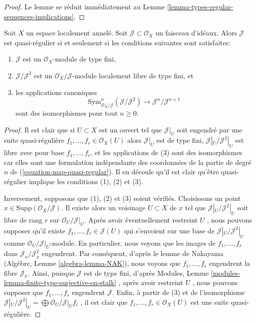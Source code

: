\begin{proof}
Le lemme se réduit immédiatement au Lemme  \ref{lemma-types-regular-sequences-implications}.
\end{proof}

\begin{lemma}
\label{lemma-quasi-regular-ideal}
Soit  $X$  un espace localement annelé. Soit  $\mathcal{J} \subset \mathcal{O}_X$  un faisceau
d'idéaux. Alors  $\mathcal{J}$  est quasi-régulier si et seulement si les conditions
suivantes sont satisfaites:
\begin{enumerate}
\item $\mathcal{J}$  est un  $\mathcal{O}_X$-module de type fini,
\item $\mathcal{J}/\mathcal{J}^2$  est un  $\mathcal{O}_X/\mathcal{J}$-module localement libre de type fini, et
\item les applications canoniques
$$
\text{Sym}^n_{\mathcal{O}_X/\mathcal{J}}(\mathcal{J}/\mathcal{J}^2)
\longrightarrow
\mathcal{J}^n/\mathcal{J}^{n + 1}
$$
sont des isomorphismes pour tout  $n \geq 0$.
\end{enumerate}
\end{lemma}

\begin{proof}
Il est clair que si  $U \subset X$  est un ouvert tel que  $\mathcal{J}|_U$  soit engendré
par une suite quasi-régulière  $f_1, \ldots, f_r \in \mathcal{O}_X(U)$  alors  $\mathcal{J}|_U$  est de type fini,
 $\mathcal{J}|_U/\mathcal{J}^2|_U$  est libre avec pour base  $f_1, \ldots, f_r$, et les applications de (3)
sont des isomorphismes car elles sont une formulation indépendante des coordonnées
de la partie de degré  $n$  de (\ref{equation-map-quasi-regular}). Il en découle qu'il est
clair qu'être quasi-régulier implique les conditions (1), (2) et (3).

\medskip\noindent
Inversement, supposons que (1), (2) et (3) soient vérifiés. Choisissons un point
 $x \in \text{Supp}(\mathcal{O}_X/\mathcal{J})$. Il existe alors un voisinage  $U \subset X$  de  $x$  tel que
 $\mathcal{J}|_U/\mathcal{J}^2|_U$  soit libre de rang  $r$  sur  $\mathcal{O}_U/\mathcal{J}|_U$. Après avoir
éventuellement restreint  $U$ , nous pouvons supposer qu'il existe
 $f_1, \ldots, f_r \in \mathcal{J}(U)$  qui s'envoient sur une base de  $\mathcal{J}|_U/\mathcal{J}^2|_U$  comme
 $\mathcal{O}_U/\mathcal{J}|_U$-module. En particulier, nous voyons que les images de  $f_1, \ldots, f_r$ 
dans  $\mathcal{J}_x/\mathcal{J}^2_x$  engendrent. Par conséquent, d'après le lemme de Nakayama
(Algèbre, Lemme  \ref{algebra-lemma-NAK}), nous voyons que  $f_1, \ldots, f_r$  engendrent la fibre
 $\mathcal{J}_x$. Ainsi, puisque  $\mathcal{J}$  est de type fini, d'après Modules, Lemme
 \ref{modules-lemma-finite-type-surjective-on-stalk} , après avoir restreint  $U$ , nous pouvons supposer que
 $f_1, \ldots, f_r$  engendrent  $\mathcal{J}$. Enfin, à partir de (3) et de l'isomorphisme
 $\mathcal{J}|_U/\mathcal{J}^2|_U = \bigoplus \mathcal{O}_U/\mathcal{J}|_U f_i$ , il est clair que  $f_1, \ldots, f_r \in \mathcal{O}_X(U)$  est une suite quasi-régulière.
\end{proof}

